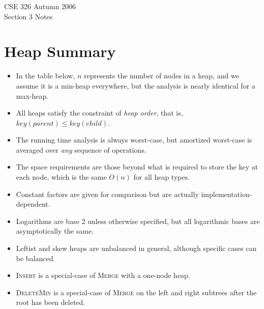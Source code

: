 \documentclass{article}[10pt,letterpaper]
\begin{document}
\begin{center}
\Large{CSE 326 Autumn 2006}\\
\large{Section 3 Notes}
\end{center}

\section{Heap Summary}

\begin{itemize}
\item
In the table below, $n$ represents the number of nodes in a heap, and
we assume it is a min-heap everywhere, but the analysis is nearly
identical for a max-heap.
\item
All heaps satisfy the constraint of \textit{heap order}, that is,
$key(parent) \le key(child)$.
\item
The running time analysis is always worst-case, but amortized worst-case
is averaged over \textit{any} sequence of operations.
\item
The space requirements are those beyond what is required to store the
key at each node, which is the same $O(n)$ for all heap types.
\item
Constant factors are given for comparison but are actually
implementation-dependent.
\item
Logarithms are base 2 unless otherwise specified, but all logarithmic
bases are asymptotically the same.
\item
Leftist and skew heaps are unbalanced in general, although specific cases
can be balanced.
\item
\textsc{Insert} is a special-case of \textsc{Merge} with a one-node heap.
\item
\textsc{DeleteMin} is a special-case of \textsc{Merge} on the left and
right subtrees after the root has been deleted.
\end{itemize}
\end{document}
